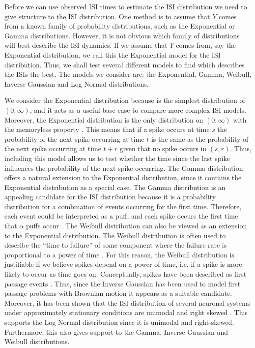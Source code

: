 \documentclass[oneside, 12 pt]{book}
\begin{document}
Before we can use observed ISI times to estimate the ISI distribution we need to give structure to the ISI distribution. One method is to assume that $Y$ comes from a known family of probability distributions, such as the Exponential or Gamma distributions. However, it is not obvious which family of distributions will best describe the ISI dynamics. If we assume that $Y$ comes from, say the Exponential distribution, we call this the Exponential model for the ISI distribution.  Thus, we shall test several different models to find which describes the  ISIs the best. The models we consider are: the Exponential, Gamma, Weibull, Inverse Gaussian and Log Normal distributions. 

 We consider the Exponential distribution because is the simplest distribution of $(0,\infty)$, and it acts as a useful base case to compare more complex ISI models. Moreover, the Exponential distribution is the only distribution on $(0,\infty)$ with the memoryless property \cite{ross98}. This means that if a spike occurs at time $s$ the probability of the next spike occurring at time $t$ is the same as the probability of the next spike occurring at time $t+r$ given that no spike occurs in $(s,r)$. Thus, including this model allows us to test whether the time since the last spike influences the probability of the next spike occurring.  
 The Gamma distribution offers a natural extension to the Exponential distribution, since it contains the Exponential distribution as a special case. The Gamma distribution is an appealing candidate for the ISI distribution because it is a probability distribution for a combination of events occurring for the first time. Therefore, each event could be interpreted as a  puff, and each spike occurs the first time that $\alpha$ puffs occur \cite{Powell_2020}. 
   The Weibull distribution can also be viewed as an extension to the Exponential distribution. The Weibull distribution is often used to describe the ``time to failure'' of some component where the failure rate is proportional to a power of time \cite{Weibull_2018}. For this reason, the Weibull distribution is justifiable if we believe  spikes depend on a power of time, i.e. if a spike is more likely to occur as time goes on. 
    Conceptually,  spikes have been described as first passage events \cite{Thurley_2011}. Thus, since the Inverse Gaussian has been used to model first passage problems with Brownian motion \cite{Chhikara_1976} it appears as a suitable candidate.   
    Moreover, it has been shown that the ISI distribution of several neuronal systems under approximately stationary conditions are unimodal and right skewed \cite{Barbieri_2001}. This supports the Log Normal distribution since it is unimodal and right-skewed. Furthermore, this also gives support to the Gamma, Inverse Gaussian and Weibull distributions. 
\end{document}
